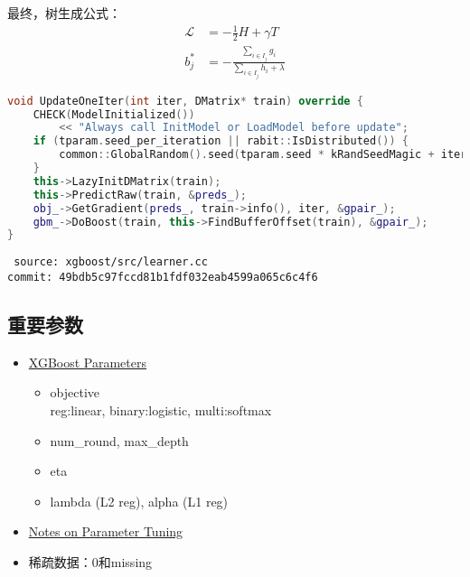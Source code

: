\begin{frame}[fragile]
    最终，树生成公式：
    \begin{align*}
        \mathcal{L} &= - \frac{1}{2} H + \gamma T \\
        b^*_j &= - \frac{\sum_{i \in I_j} g_i}{\sum_{i \in I_j} h_i + \lambda}
    \end{align*}

    \begin{lstlisting}[language=C++,style=myScalastyle]
void UpdateOneIter(int iter, DMatrix* train) override {
    CHECK(ModelInitialized())
        << "Always call InitModel or LoadModel before update";
    if (tparam.seed_per_iteration || rabit::IsDistributed()) {
        common::GlobalRandom().seed(tparam.seed * kRandSeedMagic + iter);
    }
    this->LazyInitDMatrix(train);
    this->PredictRaw(train, &preds_);
    obj_->GetGradient(preds_, train->info(), iter, &gpair_);
    gbm_->DoBoost(train, this->FindBufferOffset(train), &gpair_);
}
    \end{lstlisting}
    {\tiny \tt
    source: xgboost/src/learner.cc \\[-2ex]
    commit: 49bdb5c97fccd81b1fdf032eab4599a065c6c4f6}
\end{frame}


\subsection{重要参数}


\begin{frame}
    \begin{itemize}
        \item \href{https://github.com/dmlc/xgboost/blob/master/doc/parameter.md}{XGBoost Parameters}
            \begin{itemize}
                \item objective \\
                      reg:linear, binary:logistic, multi:softmax
                \item num\_round, max\_depth
                \item eta
                \item lambda (L2 reg), alpha (L1 reg)
            \end{itemize}

        \item \href{https://github.com/dmlc/xgboost/blob/master/doc/how_to/param_tuning.md}{Notes on Parameter Tuning}

        \item 稀疏数据：0和missing
    \end{itemize}
\end{frame}
